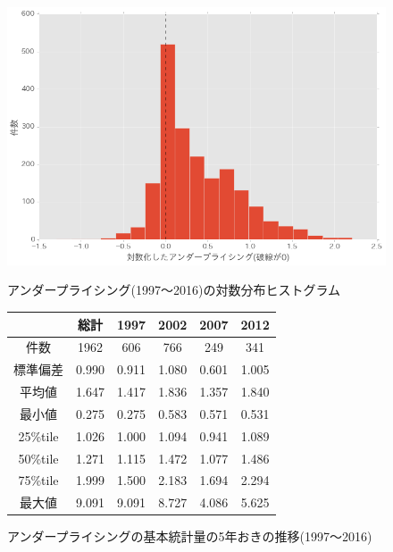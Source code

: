 \documentclass{jsarticle}
\begin{document}
\begin{figure}[p]
  \begin{center}
  \caption{アンダープライシング(1997〜2016)の対数分布ヒストグラム}
    \includegraphics[clip,width=14cm]{./loghist.png}
    \label{loghist}
  \end{center}
\end{figure}

\begin{figure}[p]
  \begin{center}
  \caption{アンダープライシングの基本統計量の5年おきの推移(1997〜2016)}
\begin{tabular*}{120mm}{@{\extracolsep{\fill}}c|ccccc}

\hline
\  & 総計 &  1997 &  2002&   2007  & 2012 \\
\hline \hline
件数 &1962 & 606 & 766 & 249 & 341 \\
\hline
標準偏差&       0.990  &0.911  &1.080 & 0.601 & 1.005 \\
\hline
平均値   &  1.647 & 1.417 & 1.836 & 1.357 & 1.840 \\
\hline
最小値    &     0.275 & 0.275 & 0.583 & 0.571&  0.531 \\
25\%tile   &       1.026 & 1.000  &1.094 & 0.941 & 1.089 \\
50\%tile    &      1.271&  1.115 & 1.472 & 1.077  &1.486 \\
75\%tile     &     1.999 & 1.500 & 2.183  &1.694 & 2.294 \\
最大値  &   9.091 & 9.091&  8.727 & 4.086 & 5.625 \\
\hline
	\end{tabular*}
	\label{stats} 
  \end{center}
\end{figure}
\end{document}
